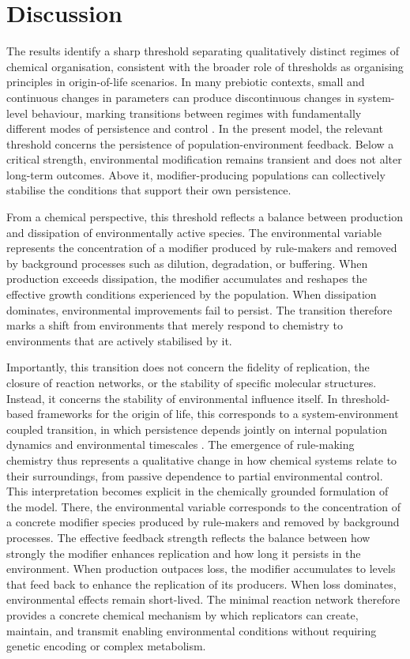 \documentclass[11pt]{article}
\begin{document}
 \section*{Discussion}

The results identify a sharp threshold separating qualitatively distinct regimes of chemical organisation, consistent with the broader role of thresholds as organising principles in origin-of-life scenarios. In many prebiotic contexts, small and continuous changes in parameters can produce discontinuous changes in system-level behaviour, marking transitions between regimes with fundamentally different modes of persistence and control \cite{Jeancolas2020Threshold}. In the present model, the relevant threshold concerns the persistence of population-environment feedback. Below a critical strength, environmental modification remains transient and does not alter long-term outcomes. Above it, modifier-producing populations can collectively stabilise the conditions that support their own persistence.

From a chemical perspective, this threshold reflects a balance between production and dissipation of environmentally active species. The environmental variable represents the concentration of a modifier produced by rule-makers and removed by background processes such as dilution, degradation, or buffering. When production exceeds dissipation, the modifier accumulates and reshapes the effective growth conditions experienced by the population. When dissipation dominates, environmental improvements fail to persist. The transition therefore marks a shift from environments that merely respond to chemistry to environments that are actively stabilised by it.

Importantly, this transition does not concern the fidelity of replication, the closure of reaction networks, or the stability of specific molecular structures. Instead, it concerns the stability of environmental influence itself. In threshold-based frameworks for the origin of life, this corresponds to a system-environment coupled transition, in which persistence depends jointly on internal population dynamics and environmental timescales \cite{Jeancolas2020Threshold}. The emergence of rule-making chemistry thus represents a qualitative change in how chemical systems relate to their surroundings, from passive dependence to partial environmental control. This interpretation becomes explicit in the chemically grounded formulation of the model. There, the environmental variable corresponds to the concentration of a concrete modifier species produced by rule-makers and removed by background processes. The effective feedback strength reflects the balance between how strongly the modifier enhances replication and how long it persists in the environment. When production outpaces loss, the modifier accumulates to levels that feed back to enhance the replication of its producers. When loss dominates, environmental effects remain short-lived. The minimal reaction network therefore provides a concrete chemical mechanism by which replicators can create, maintain, and transmit enabling environmental conditions without requiring genetic encoding or complex metabolism.
\end{document}
